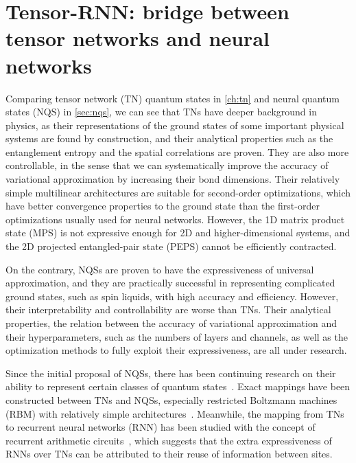 \chapter{Tensor-RNN: bridge between tensor networks and neural networks}
\label{ch:tensor-rnn}

Comparing tensor network (TN) quantum states in \cref{ch:tn} and neural quantum states (NQS) in \cref{sec:nqs}, we can see that TNs have deeper background in physics, as their representations of the ground states of some important physical systems are found by construction, and their analytical properties such as the entanglement entropy and the spatial correlations are proven. They are also more controllable, in the sense that we can systematically improve the accuracy of variational approximation by increasing their bond dimensions. Their relatively simple multilinear architectures are suitable for second-order optimizations, which have better convergence properties to the ground state than the first-order optimizations usually used for neural networks. However, the 1D matrix product state (MPS) is not expressive enough for 2D and higher-dimensional systems, and the 2D projected entangled-pair state (PEPS) cannot be efficiently contracted.

On the contrary, NQSs are proven to have the expressiveness of universal approximation, and they are practically successful in representing complicated ground states, such as spin liquids, with high accuracy and efficiency. However, their interpretability and controllability are worse than TNs. Their analytical properties, the relation between the accuracy of variational approximation and their hyperparameters, such as the numbers of layers and channels, as well as the optimization methods to fully exploit their expressiveness, are all under research.

Since the initial proposal of NQSs, there has been continuing research on their ability to represent certain classes of quantum states~\cite{gao2017efficient, carleo2018constructing, sharir2022neural}. Exact mappings have been constructed between TNs and NQSs, especially restricted Boltzmann machines (RBM) with relatively simple architectures~\cite{glasser2018neural, chen2018equivalence}. Meanwhile, the mapping from TNs to recurrent neural networks (RNN) has been studied with the concept of recurrent arithmetic circuits~\cite{levine2017long, levine2019quantum}, which suggests that the extra expressiveness of RNNs over TNs can be attributed to their reuse of information between sites.

